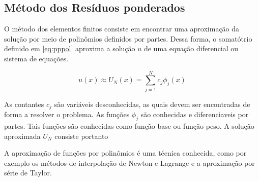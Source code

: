 \subsection{Método dos Resíduos ponderados}

O método dos elementos finitos consiste em encontrar uma aproximação da solução por meio de polinômios definidos por partes. Dessa forma, o somatótrio definido em \ref{eq:pppol} aproxima a solução $ u $ de uma equação diferencial ou sistema de equações.
\citep[p. 97]{davis}

\begin{equation}
	\label{eq:pppol}
	u(x) \approx U_N (x) = \sum_{j = 1}^{N} c_j \phi_j (x)
\end{equation}

As contantes $ c_j $ são variáveis desconhecidas, as quais devem ser encontradas de forma a resolver o problema. As funções $ \phi_j $ são conhecidas e diferenciaveis por partes. Tais funções são conhecidas como função base ou função peso. A solução aproximada $ U_N $ consiste portanto

A aproximação de funções por polinômios é uma técnica conhecida, como por exemplo os métodos de interpolação de Newton e Lagrange e a aproximação por série de Taylor. 